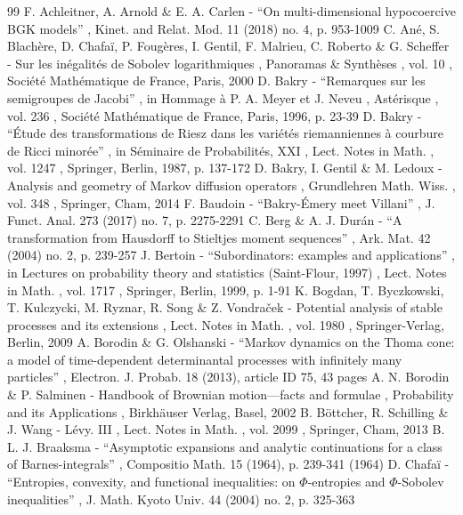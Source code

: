 \documentclass[11pt]{article}
\numberwithin{equation}{section}
\theoremstyle{plain}
\theoremstyle{definition}
\begin{document}
\begin{thebibliography}{99}
 F. Achleitner, A. Arnold \& E. A. Carlen - “On multi-dimensional hypocoercive BGK models” , Kinet. and Relat. Mod. 11 (2018) no. 4, p. 953-1009
 C. Ané, S. Blachère, D. Chafaï, P. Fougères, I. Gentil, F. Malrieu, C. Roberto \& G. Scheffer - Sur les inégalités de Sobolev logarithmiques , Panoramas \& Synthèses , vol. 10 , Société Mathématique de France, Paris, 2000
 D. Bakry - “Remarques sur les semigroupes de Jacobi” , in Hommage à P. A. Meyer et J. Neveu , Astérisque , vol. 236 , Société Mathématique de France, Paris, 1996, p. 23-39
 D. Bakry - “Étude des transformations de Riesz dans les variétés riemanniennes à courbure de Ricci minorée” , in Séminaire de Probabilités, XXI , Lect. Notes in Math. , vol. 1247 , Springer, Berlin, 1987, p. 137-172
 D. Bakry, I. Gentil \& M. Ledoux - Analysis and geometry of Markov diffusion operators , Grundlehren Math. Wiss. , vol. 348 , Springer, Cham, 2014
 F. Baudoin - “Bakry-Émery meet Villani” , J. Funct. Anal. 273 (2017) no. 7, p. 2275-2291
 C. Berg \& A. J. Durán - “A transformation from Hausdorff to Stieltjes moment sequences” , Ark. Mat. 42 (2004) no. 2, p. 239-257
 J. Bertoin - “Subordinators: examples and applications” , in Lectures on probability theory and statistics (Saint-Flour, 1997) , Lect. Notes in Math. , vol. 1717 , Springer, Berlin, 1999, p. 1-91
 K. Bogdan, T. Byczkowski, T. Kulczycki, M. Ryznar, R. Song \& Z. Vondraček - Potential analysis of stable processes and its extensions , Lect. Notes in Math. , vol. 1980 , Springer-Verlag, Berlin, 2009
 A. Borodin \& G. Olshanski - “Markov dynamics on the Thoma cone: a model of time-dependent determinantal processes with infinitely many particles” , Electron. J. Probab. 18 (2013), article ID 75, 43 pages
 A. N. Borodin \& P. Salminen - Handbook of Brownian motion—facts and formulae , Probability and its Applications , Birkhäuser Verlag, Basel, 2002
 B. Böttcher, R. Schilling \& J. Wang - Lévy. III , Lect. Notes in Math. , vol. 2099 , Springer, Cham, 2013
 B. L. J. Braaksma - “Asymptotic expansions and analytic continuations for a class of Barnes-integrals” , Compositio Math. 15 (1964), p. 239-341 (1964)
 D. Chafaï - “Entropies, convexity, and functional inequalities: on $\Phi $-entropies and $\Phi $-Sobolev inequalities” , J. Math. Kyoto Univ. 44 (2004) no. 2, p. 325-363

\end{thebibliography}
\end{document}
